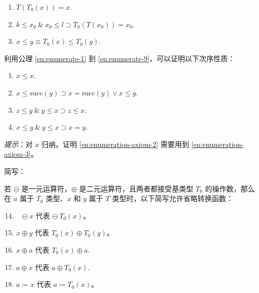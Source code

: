 \begin{enumerate}[wide, nosep, label=(\arabic*)]
	\tabto*{1.8em}\& $k_n = \text{succ}(k_{n-1}) = T$.max.
	
	把类型定义为子界的一般形式是：
	
	\quad \textbf{type} $T=k\,.\,.\,l;$
	
	\noindent
	其中 $k$ 和 $l$ 属于基类型 $T_0$。
	
	该类型的附加公理是：
	
	\tabto*{.9em}(10) $T$.min $= k$
	
	\tabto*{1.8em}\& $T$.max $= l$.

	\setcounter{enumi}{10}
	\item $T(T_0(x)) = x$.

	\item $k \leqslant x_0\ \&\ x_0 \leqslant l \supset T_0(T(x_0)) = x_0$.

	\item $x \leqslant y \equiv T_0(x) \leqslant T_0(y).$
\end{enumerate}

利用公理 \ref{en:enumerate-1} 到 \ref{en:enumerate-9}，可以证明以下次序性质：

\begin{enumerate}[wide, nosep, label=(T\arabic*)]
	\item $x \leqslant x$.

	\item \label{en:enumeration-axiom-2}
	$x \leqslant \text{succ}(y) \supset x = \text{succ}(y) \vee x \leqslant y$.
	
	\item \label{en:enumeration-axiom-3}
	$z \leqslant y\ \&\ y \leqslant x \supset z \leqslant x.$
	
	\item $x \leqslant y\ \&\ y \leqslant x \supset x = y.$
\end{enumerate}

\noindent
\textit{提示}：对 $x$ 归纳。证明 \ref{en:enumeration-axiom-2} 需要用到 \ref{en:enumeration-axiom-3}。

\noindent
简写：

\noindent
若 $\ominus$ 是一元运算符，$\oplus$ 是二元运算符，且两者都接受基类型 $T_0$ 的操作数，那么在 $a$ 属于 $T_0$ 类型、$x$ 和 $y$ 属于 $T$ 类型时，以下简写允许省略转换函数：

\begin{enumerate}[wide, nosep, label=(\arabic*)]
	\setcounter{enumi}{13}
	
	\item ~ $\ominus\ x$ 代表 $\ominus\ T_0(x)$。

	\item $x \oplus y$ 代表 $T_0(x) \oplus T_0(y)$。
	
	\item $x \oplus a$ 代表 $T_0(x) \oplus a.$

	\item $a \oplus x$ 代表 $a \oplus T_0(x).$

	\item $a \coloneq x$ 代表 $a\coloneq T_0(x)$。
\end{enumerate}

